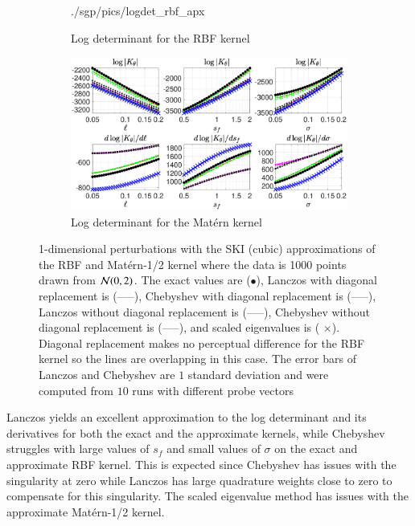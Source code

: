 \begin{figure}[ht]
\begin{center}
\begin{subfigure}{0.46\textwidth}
      {./sgp/pics/logdet_rbf_apx}
      \caption{Log determinant for the RBF kernel}
      \label{fig:1dpert_kissgp_c}
    \end{subfigure}
    \begin{subfigure}{0.46\textwidth}
      \centering
      \includegraphics[width=\textwidth,trim=2.5cm 0cm 3.5cm 0cm,clip]
      {./sgp/pics/logdet_matern_apx}
      \caption{Log determinant for the Mat\'ern kernel}
      \label{fig:1dpert_kissgp_d}
    \end{subfigure}
    \caption{1\hyp{}dimensional perturbations with the SKI (cubic)
    approximations of the RBF and Mat\'ern\hyp{}1/2 kernel where the data is
    1000 points drawn from $\mathcal{N}(0,2)$. The exact values are ($\bullet$),
    Lanczos with diagonal replacement is ({\color{red}-----}), Chebyshev with
    diagonal replacement is ({\color{green}-----}), Lanczos without diagonal
    replacement is ({\color{magenta}-----}), Chebyshev without diagonal
    replacement is ({\color{black}-----}), and scaled eigenvalues is ({
    \color{blue} $\times$}). Diagonal replacement makes no perceptual difference
    for the RBF kernel so the lines are overlapping in this case. The error bars
    of Lanczos and Chebyshev are $1$ standard deviation and were computed from
    $10$ runs with different probe vectors}\label{fig:1dpert_kissgp}
 \end{center}
\end{figure}

Lanczos yields an excellent approximation to the log determinant and its
derivatives for both the exact and the approximate kernels, while Chebyshev
struggles with large values of $s_f$ and small values of $\sigma$ on the
exact and approximate RBF kernel. This is expected since Chebyshev has issues
with the singularity at zero while Lanczos has large quadrature weights
close to zero to compensate for this singularity. The scaled eigenvalue method
has issues with the approximate Mat\'ern\hyp{}1/2 kernel.

